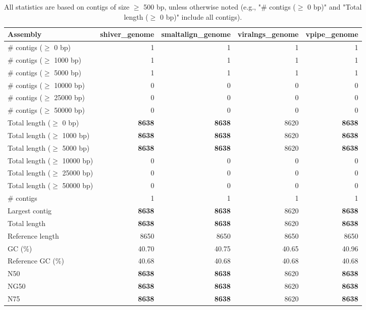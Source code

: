 \documentclass[12pt,a4paper]{article}
\begin{document}
\begin{table}[ht]
\begin{center}
\caption{All statistics are based on contigs of size $\geq$ 500 bp, unless otherwise noted (e.g., "\# contigs ($\geq$ 0 bp)" and "Total length ($\geq$ 0 bp)" include all contigs).}
\begin{tabular}{|l*{4}{|r}|}
\hline
Assembly & shiver\_genome & smaltalign\_genome & viralngs\_genome & vpipe\_genome \\ \hline
\# contigs ($\geq$ 0 bp) & 1 & 1 & 1 & 1 \\ \hline
\# contigs ($\geq$ 1000 bp) & 1 & 1 & 1 & 1 \\ \hline
\# contigs ($\geq$ 5000 bp) & 1 & 1 & 1 & 1 \\ \hline
\# contigs ($\geq$ 10000 bp) & 0 & 0 & 0 & 0 \\ \hline
\# contigs ($\geq$ 25000 bp) & 0 & 0 & 0 & 0 \\ \hline
\# contigs ($\geq$ 50000 bp) & 0 & 0 & 0 & 0 \\ \hline
Total length ($\geq$ 0 bp) & {\bf 8638} & {\bf 8638} & 8620 & {\bf 8638} \\ \hline
Total length ($\geq$ 1000 bp) & {\bf 8638} & {\bf 8638} & 8620 & {\bf 8638} \\ \hline
Total length ($\geq$ 5000 bp) & {\bf 8638} & {\bf 8638} & 8620 & {\bf 8638} \\ \hline
Total length ($\geq$ 10000 bp) & 0 & 0 & 0 & 0 \\ \hline
Total length ($\geq$ 25000 bp) & 0 & 0 & 0 & 0 \\ \hline
Total length ($\geq$ 50000 bp) & 0 & 0 & 0 & 0 \\ \hline
\# contigs & 1 & 1 & 1 & 1 \\ \hline
Largest contig & {\bf 8638} & {\bf 8638} & 8620 & {\bf 8638} \\ \hline
Total length & {\bf 8638} & {\bf 8638} & 8620 & {\bf 8638} \\ \hline
Reference length & 8650 & 8650 & 8650 & 8650 \\ \hline
GC (\%) & 40.70 & 40.75 & 40.65 & 40.96 \\ \hline
Reference GC (\%) & 40.68 & 40.68 & 40.68 & 40.68 \\ \hline
N50 & {\bf 8638} & {\bf 8638} & 8620 & {\bf 8638} \\ \hline
NG50 & {\bf 8638} & {\bf 8638} & 8620 & {\bf 8638} \\ \hline
N75 & {\bf 8638} & {\bf 8638} & 8620 & {\bf 8638} \\ \hline

\end{tabular}
\end{center}
\end{table}
\end{document}
